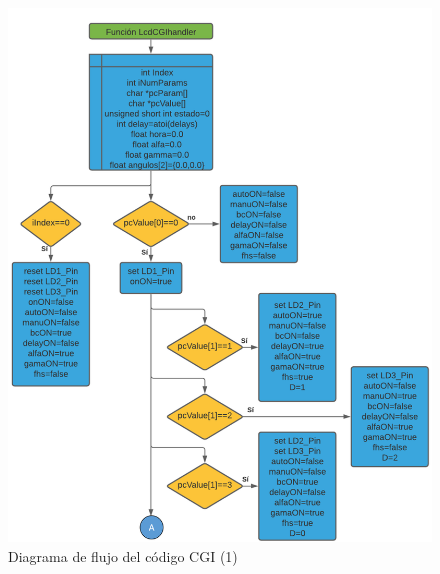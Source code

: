 \begin{figure}[H]
	\centering
	\includegraphics[width=\columnwidth]{imagenes/Diagrama CGI 1.png}
	\caption{Diagrama de flujo del código CGI (1)}
	\label{fig:dia_flujCGI1}
\end{figure}

